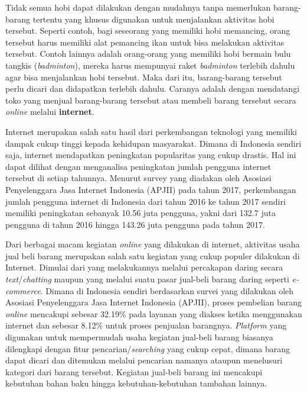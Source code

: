 \documentclass[a4paper]{article}
\begin{document}
Tidak semua hobi dapat dilakukan dengan mudahnya tanpa memerlukan barang-barang tertentu yang khusus digunakan untuk menjalankan aktivitas hobi tersebut. Seperti contoh, bagi seseorang yang memiliki hobi memancing, orang tersebut harus memiliki alat pemancing ikan untuk bisa melakukan aktivitas tersebut. Contoh lainnya adalah orang-orang yang memiliki hobi bermain bulu tangkis (\textit{badminton}), mereka harus mempunyai raket \textit{badminton} terlebih dahulu agar bisa menjalankan hobi tersebut. Maka dari itu, barang-barang tersebut perlu dicari dan didapatkan terlebih dahulu. Caranya adalah dengan mendatangi toko yang menjual barang-barang tersebut atau membeli barang tersebut secara \textit{online} melalui \textbf{internet}.

Internet merupakan salah satu hasil dari perkembangan teknologi yang memiliki dampak cukup tinggi kepada kehidupan masyarakat. Dimana di Indonesia sendiri saja, internet mendapatkan peningkatan popularitas yang cukup drastis. Hal ini dapat dilihat dengan menganalisa peningkatan jumlah pengguna internet tersebut di setiap tahunnya. Menurut survey yang diadakan oleh Asosiasi Penyelenggara Jasa Internet Indonesia (APJII) pada tahun 2017, perkembangan jumlah pengguna internet di Indonesia dari tahun 2016 ke tahun 2017 sendiri memiliki peningkatan sebanyak 10.56 juta pengguna, yakni dari 132.7 juta pengguna di tahun 2016 hingga 143.26 juta pengguna pada tahun 2017\autocite{indonesia2017infografis}.

Dari berbagai macam kegiatan \textit{online} yang dilakukan di internet, aktivitas usaha jual beli barang merupakan salah satu kegiatan yang cukup populer dilakukan di Internet. Dimulai dari yang melakukannya melalui percakapan daring secara \textit{text}/\textit{chatting} maupun yang melalui suatu pasar jual-beli barang daring seperti \textit{e-commerce}. Dimana di Indonesia sendiri berdasarkan survei yang dilakukan oleh Asosiasi Penyelenggara Jasa Internet Indonesia (APJII), proses pembelian barang \textit{online} mencakupi sebesar 32.19\% pada layanan yang diakses ketika menggunakan internet dan sebesar 8.12\% untuk proses penjualan barangnya\autocite{indonesia2017infografis}. \textit{Platform} yang digunakan untuk mempermudah usaha kegiatan jual-beli barang biasanya dilengkapi dengan fitur pencarian/\textit{searching} yang cukup cepat, dimana barang dapat dicari dan ditemukan melalui pencarian namanya ataupun menelusuri kategori dari barang tersebut. Kegiatan jual-beli barang ini mencakupi kebutuhan bahan baku hingga kebutuhan-kebutuhan tambahan lainnya.
\end{document}
